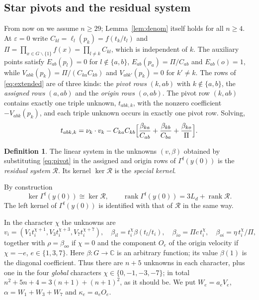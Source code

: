 \documentclass{amsart}
\theoremstyle{definition}
\newtheorem{definition}[theorem]{Definition}
\theoremstyle{remark}
\numberwithin{equation}{section}
\newcommand{\CC}{\mathbb{C}}
\DeclareMathOperator{\rank}{rank}
\begin{document}
\subsection{Star pivots and the residual system}\label{sec:pivots}
From now on we assume $n\ge29$; Lemma~\ref{lem:denom} itself holds for all $n\ge4$.
At $\varepsilon=0$ write $C_{kl}=\ell_l(p_k)=f(t_k/t_l)$ and
$\Pi=\prod_{x\in G\smallsetminus\{1\}}f(x)=\prod_{l\ne k}C_{kl}$, which is independent
of $k$. The auxiliary points satisfy $E_{ab}(p_l)=0$ for $l\notin\{a,b\}$,
$E_{ab}(p_a)=\Pi/C_{ab}$ and $E_{ab}(o)=1$, while $V_{abk}(p_k)=\Pi/(C_{ka}C_{kb})$
and $V_{abk'}(p_k)=0$ for $k'\ne k$. The rows of \eqref{eq:extended} are of three
kinds: the \emph{pivot rows} $(k,ab)$ with $k\notin\{a,b\}$, the \emph{assigned rows}
$(a,ab)$ and the \emph{origin rows} $(o,ab)$. The pivot row $(k,ab)$ contains exactly
one triple unknown, $t_{abk,k}$, with the nonzero coefficient $-V_{abk}(p_k)$, and
each triple unknown occurs in exactly one pivot row. Solving,
\begin{equation}\label{eq:pivot}
  t_{abk,k}=\nu_k\cdot v_k-C_{ka}C_{kb}\Bigl[\frac{\beta_{ka}}{C_{ab}}
    +\frac{\beta_{kb}}{C_{ba}}+\frac{\beta_{ko}}{\Pi}\Bigr].
\end{equation}
\begin{definition}\label{def:special}
The linear system in the unknowns $(v,\beta)$ obtained by substituting \eqref{eq:pivot} in
the assigned and origin rows of $\Gamma^{\mathrm f}(y(0))$ is the \emph{residual system}
$\mathcal R$. Its kernel $\ker\mathcal R$ is the \emph{special kernel}.
\end{definition}

By construction
\begin{equation}\label{eq:residual}
  \ker\Gamma^{\mathrm f}(y(0))\cong\ker\mathcal R,\qquad
  \rank\Gamma^{\mathrm f}(y(0))=3L_d+\rank\mathcal R .
\end{equation}
The left kernel of $\Gamma^{\mathrm f}(y(0))$ is identified with that of $\mathcal R$ in the same way.

In the character $\chi$ the unknowns are
\[
  v_i=(V_1t_i^{\chi+1},V_3t_i^{\chi+3},V_7t_i^{\chi+7}),\quad
  \beta_{il}=t_i^\chi\beta(t_l/t_i),\quad \beta_{io}=\Pi c\,t_i^\chi,\quad
  \beta_{oi}=\eta\,t_i^\chi/\Pi,
\]
together with $\rho=\beta_{oo}$ if $\chi=0$ and the component $O_e$ of the origin
velocity if $\chi=-e$, $e\in\{1,3,7\}$. Here $\beta\colon G\to\CC$ is an arbitrary
function; its value $\beta(1)$ is the diagonal coefficient. Thus there are $n+5$
unknowns in each character, plus one in the four \emph{global} characters
$\chi\in\{0,-1,-3,-7\}$; in total $n^2+5n+4=3(n+1)+(n+1)^2$, as it should be. We put
$W_e=a_eV_e$, $\alpha=W_1+W_3+W_7$ and $\kappa_e=a_eO_e$.
\end{document}
